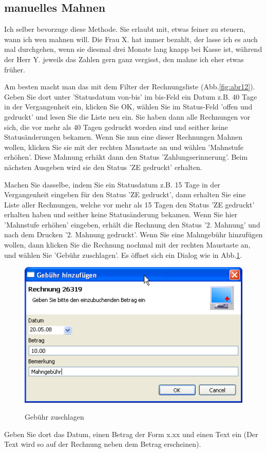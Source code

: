 \documentclass[a4paper]{scrartcl}
\begin{document}
\subsection{manuelles Mahnen}
Ich selber bevorzuge diese Methode. Sie erlaubt mit, etwas feiner zu steuern, wann ich wen mahnen will. Die Frau X. hat immer bezahlt, der lasse ich es auch mal durchgehen, wenn sie diesmal drei Monate lang knapp bei Kasse ist, während der Herr Y. jeweils das Zahlen gern ganz vergisst, den mahne ich eher etwas früher.

\medskip

Am besten macht man das mit dem Filter der Rechnungsliste (Abb.\ref{fig:abr12}). Geben Sie dort unter 'Statusdatum von-bis' im bis-Feld ein Datum z.B. 40 Tage in der Vergangenheit ein, klicken Sie OK, wählen Sie im Status-Feld 'offen und gedruckt' und lesen Sie die Liste neu ein. Sie haben dann alle Rechnungen vor sich, die vor mehr als 40 Tagen gedruckt worden sind und seither keine Statusänderungen bekamen. Wenn Sie nun eine dieser Rechnungen Mahnen wollen, klicken Sie sie mit der rechten Maustaste an und wählen 'Mahnstufe erhöhen'. Diese Mahnung erhäkt dann den Status 'Zahlungserinnerung'. Beim nächsten Ausgeben wird sie den Status 'ZE gedruckt' erhalten.

\medskip

Machen Sie dasselbe, indem Sie ein Statusdatum z.B. 15 Tage in der Vergangenheit eingeben für den Status 'ZE gedruckt', dann erhalten Sie eine Liste aller Rechnungen, welche vor mehr als 15 Tagen den Status 'ZE gedruckt' erhalten haben und seither keine Statusänderung bekamen. Wenn Sie hier 'Mahnstufe erhöhen' eingeben, erhält die Rechnung den Status '2. Mahnung' und nach dem Drucken '2. Mahnung gedruckt'. Wenn Sie eine Mahngebühr hinzufügen wollen, dann klicken Sie die Rechnung nochmal mit der rechten Maustaste an, und wählen Sie 'Gebühr zuschlagen'. Es öffnet sich ein Dialog wie in Abb.\ref{fig:abr22}.
\begin{figure}
  \includegraphics{abr22}\\
  \caption{Gebühr zuschlagen}\label{fig:abr22}
\end{figure}
Geben Sie dort das Datum, einen Betrag der Form x.xx und einen Text ein (Der Text wird so auf der Rechnung neben dem Betrag erscheinen).
\end{document}

